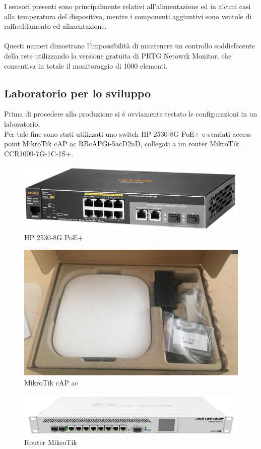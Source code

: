 \documentclass[Realizzazione.tex]{subfiles}
\begin{document}
I sensori presenti sono principalmente relativi all'alimentazione ed in alcuni casi alla temperatura del dispositivo, mentre i componenti aggiuntivi sono ventole di raffreddamento ed alimentazione. \\\\
Questi numeri dimostrano l'impossibilità di mantenere un controllo soddisfacente della rete utilizzando la versione gratuita di PRTG Netowrk Monitor, che consentiva in totale il monitoraggio di 1000 elementi.

\subsection{Laboratorio per lo sviluppo}
Prima di procedere alla produzione si è ovviamente testato le configurazioni in un laboratorio. \\
Per tale fine sono stati utilizzati uno switch HP 2530-8G PoE+ e svariati access point MikroTik cAP ac RBcAPGi-5acD2nD, collegati a un router MikroTik CCR1009-7G-1C-1S+.

\begin{figure}[H]
	\centering
	\includegraphics[width=0.6\linewidth]{"images/HP"}
	\caption{HP 2530-8G PoE+}
	\label{fig:HP 2530-8G PoE+}
\end{figure}
\begin{figure}[H]
	\centering
	\includegraphics[width=0.6\linewidth]{"images/AP"}
	\caption{MikroTik cAP ac}
	\label{fig:MikroTik cAP ac}
\end{figure}
\begin{figure}[H]
	\centering
	\includegraphics[width=0.6\linewidth]{"images/Router"}
	\caption{Router MikroTik}
	\label{fig:Router MikroTik}
\end{figure}
\end{document}
